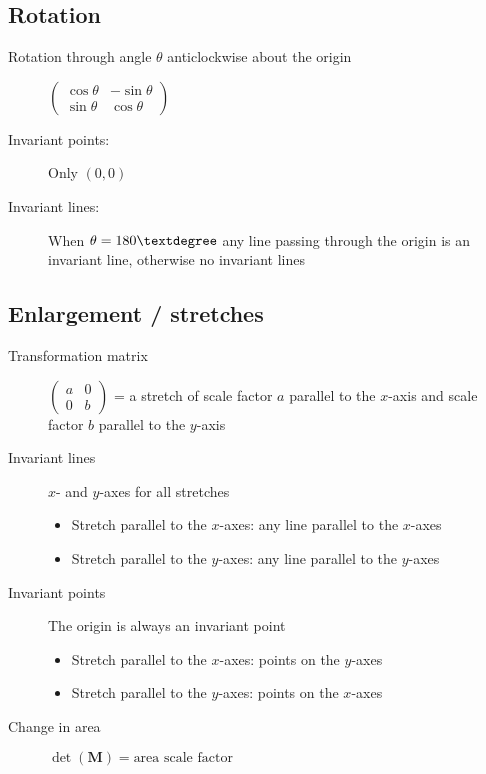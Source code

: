 \subsection{Rotation}
\begin{description}
	\item[Rotation through angle $\theta$ anticlockwise about the origin] $\begin{pmatrix}
		\cos\theta&-\sin\theta\\\sin\theta&\cos\theta
	\end{pmatrix}$
	\item[Invariant points:] Only $(0,0)$
	\item[Invariant lines:] When $\theta=180\textdegree$ any line passing through the origin is an invariant line, otherwise no invariant lines
\end{description}

\subsection{Enlargement / stretches}
\begin{description}
	\item[Transformation matrix] $\begin{pmatrix}
		a & 0 \\ 0 & b
	\end{pmatrix}$ = a stretch of scale factor $a$ parallel to the $x$-axis and scale factor $b$ parallel to the $y$-axis
	\item[Invariant lines] $x$- and $y$-axes for all stretches
	\begin{itemize}
		\item Stretch parallel to the $x$-axes: any line parallel to the $x$-axes
		\item Stretch parallel to the $y$-axes: any line parallel to the $y$-axes
	\end{itemize}
	\item[Invariant points] The origin is always an invariant point
	\begin{itemize}
		\item Stretch parallel to the $x$-axes: points on the $y$-axes
		\item Stretch parallel to the $y$-axes: points on the $x$-axes
	\end{itemize}
	\item[Change in area] $\det(\mathbf{M}) = \text{area scale factor}$
\end{description}

